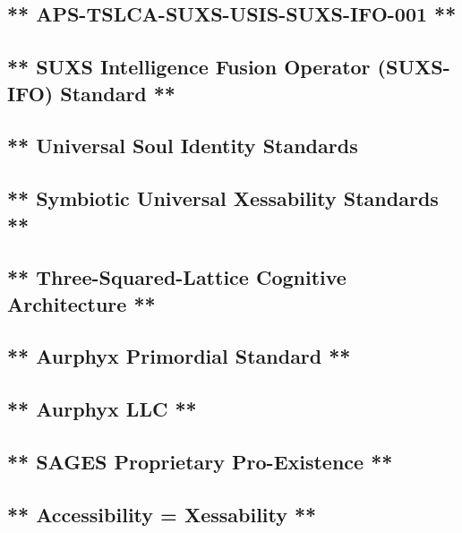 \subsection{** APS-TSLCA-SUXS-USIS-SUXS-IFO-001 **}\label{aps-tslca-suxs-usis-suxs-ifo-001}

\subsection{** SUXS Intelligence Fusion Operator (SUXS-IFO) Standard **}\label{suxs-intelligence-fusion-operator-suxs-ifo-standard}

\subsection{** Universal Soul Identity Standards}\label{universal-soul-identity-standards}

\subsection{** Symbiotic Universal Xessability Standards **}\label{symbiotic-universal-xessability-standards}

\subsection{** Three-Squared-Lattice Cognitive Architecture **}\label{three-squared-lattice-cognitive-architecture}

\subsection{** Aurphyx Primordial Standard **}\label{aurphyx-primordial-standard}

\subsection{** Aurphyx LLC **}\label{aurphyx-llc}

\subsection{** SAGES \textbar{} Proprietary \textbar{} Pro-Existence **}\label{sages-proprietary-pro-existence}

\subsection{** Accessibility = Xessability **}\label{accessibility-xessability}

